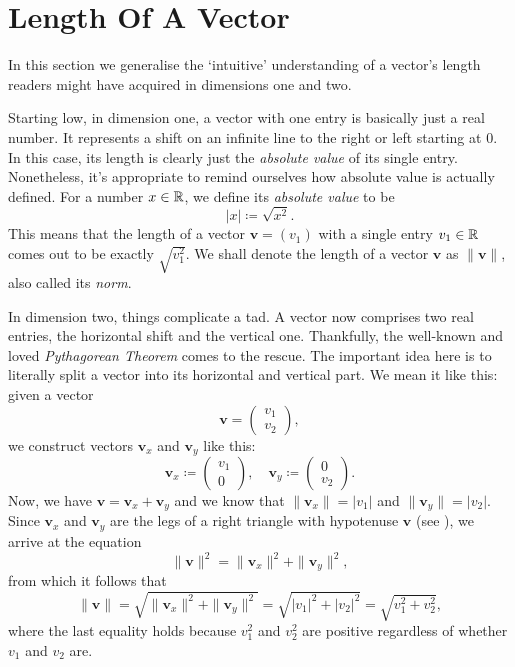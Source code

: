 \section{Length Of A Vector}
\label{sec:length-of-a-vector}

In this section we generalise the `intuitive' understanding of a vector's length
readers might have acquired in dimensions one and two.

Starting low, in dimension one, a vector with one entry is basically just a real
number. It represents a shift on an infinite line to the right or left starting
at $0$. In this case, its length is clearly just the \emph{absolute value} of
its single entry. Nonetheless, it's appropriate to remind ourselves how absolute
value is actually defined. For a number $x \in \mathbb{R}$, we define its \emph{absolute
value} to be
\[
 |x| \coloneqq \sqrt{x^2}.
\]
This means that the length of a vector $\mathbf{v} = (v_1)$ with a single entry
$v_1 \in \mathbb{R}$ comes out to be exactly $\sqrt{v_1^2}$. We shall denote the length
of a vector $\mathbf{v}$ as $\|\mathbf{v}\|$, also called its \emph{norm}.

In dimension two, things complicate a tad. A vector now comprises two real
entries, the horizontal shift and the vertical one. Thankfully, the well-known
and loved \emph{Pythagorean Theorem} comes to the rescue. The important idea
here is to literally split a vector into its horizontal and vertical part. We
mean it like this: given a vector
\[
 \mathbf{v} =
 \begin{pmatrix}
  v_1\\
  v_2
 \end{pmatrix},
\]
we construct vectors $\mathbf{v}_x$ and $\mathbf{v}_y$ like this:
\[
 \mathbf{v}_x \coloneqq
 \begin{pmatrix}
  v_1\\
  0
 \end{pmatrix}, \quad 
 \mathbf{v}_y \coloneqq 
 \begin{pmatrix}
  0\\
  v_2
 \end{pmatrix}.
\]
Now, we have $\mathbf{v} = \mathbf{v}_x + \mathbf{v}_y$ and we know that
$\|\mathbf{v}_x\| = |v_1|$ and $\|\mathbf{v}_y\| = |v_2|$. Since $\mathbf{v}_x$
and $\mathbf{v}_y$ are the legs of a right triangle with hypotenuse
$\mathbf{v}$ (see ), we arrive at the
equation
\[
 \|\mathbf{v}\|^2 = \|\mathbf{v}_x\|^2 + \|\mathbf{v}_y\|^2,
\]
from which it follows that
\[
 \|\mathbf{v}\| = \sqrt{\|\mathbf{v}_x\|^2 + \|\mathbf{v}_y\|^2} = \sqrt{|v_1|^2
 + |v_2|^2} = \sqrt{v_1^2 + v_2^2},
\]
where the last equality holds because $v_1^2$ and $v_2^2$ are positive
regardless of whether $v_1$ and $v_2$ are.
  
